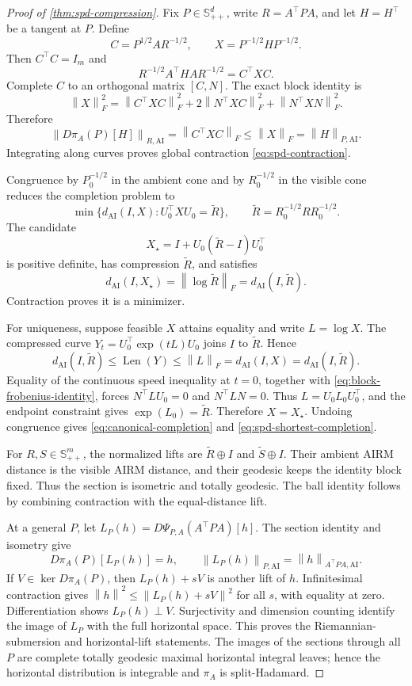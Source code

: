 \documentclass[10pt,a4paper]{amsart}
\newcommand{\AI}{\mathrm{AI}}
\newcommand{\SPD}{\mathbb S_{++}}
\newcommand{\dai}{d_{\AI}}
\newcommand{\fro}[1]{\left\lVert #1\right\rVert_F}
\newcommand{\norm}[1]{\left\lVert #1\right\rVert}
\begin{document}
\begin{proof}[Proof of \cref{thm:spd-compression}]
Fix \(P\in\SPD^d\), write \(R=A^\top PA\), and let \(H=H^\top\) be a
tangent at \(P\).  Define
\[
  C=P^{1/2}AR^{-1/2},
  \qquad
  X=P^{-1/2}HP^{-1/2}.
\]
Then \(C^\top C=I_m\) and
\[
  R^{-1/2}A^\top HA R^{-1/2}=C^\top XC.
\]
Complete \(C\) to an orthogonal matrix \([C,N]\).  The exact block identity
is
\begin{equation}
  \fro X^2
  =\fro{C^\top XC}^2
  +2\fro{N^\top XC}^2
  +\fro{N^\top XN}^2.
  \label{eq:block-frobenius-identity}
\end{equation}
Therefore
\[
  \norm{D\pi_A(P)[H]}_{R,\AI}
  =\fro{C^\top XC}
  \le\fro X
  =\norm H_{P,\AI}.
\]
Integrating along curves proves global contraction
\eqref{eq:spd-contraction}.

Congruence by \(P_0^{-1/2}\) in the ambient cone and by \(R_0^{-1/2}\) in
the visible cone reduces the completion problem to
\[
  \min\{\dai(I,X):U_0^\top XU_0=\widetilde R\},
  \qquad
  \widetilde R=R_0^{-1/2}RR_0^{-1/2}.
\]
The candidate
\[
  X_\star=I+U_0(\widetilde R-I)U_0^\top
\]
is positive definite, has compression \(\widetilde R\), and satisfies
\[
  \dai(I,X_\star)=\fro{\log\widetilde R}=\dai(I,\widetilde R).
\]
Contraction proves it is a minimizer.

For uniqueness, suppose feasible \(X\) attains equality and write
\(L=\log X\).  The compressed curve
\(Y_t=U_0^\top\exp(tL)U_0\) joins \(I\) to \(\widetilde R\).  Hence
\[
  \dai(I,\widetilde R)
  \le\operatorname{Len}(Y)
  \le\fro L
  =\dai(I,X)
  =\dai(I,\widetilde R).
\]
Equality of the continuous speed inequality at \(t=0\), together with
\eqref{eq:block-frobenius-identity}, forces
\(N^\top LU_0=0\) and \(N^\top LN=0\).  Thus
\(L=U_0L_0U_0^\top\), and the endpoint constraint gives
\(\exp(L_0)=\widetilde R\).  Therefore \(X=X_\star\).  Undoing congruence
gives \eqref{eq:canonical-completion} and
\eqref{eq:spd-shortest-completion}.

For \(R,S\in\SPD^m\), the normalized lifts are
\(\widetilde R\oplus I\) and \(\widetilde S\oplus I\).  Their ambient AIRM
distance is the visible AIRM distance, and their geodesic keeps the identity
block fixed.  Thus the section is isometric and totally geodesic.  The ball
identity follows by combining contraction with the equal-distance lift.

At a general \(P\), let
\(L_P(h)=D\Psi_{P,A}(A^\top PA)[h]\).  The section identity and isometry give
\[
  D\pi_A(P)[L_P(h)]=h,
  \qquad
  \norm{L_P(h)}_{P,\AI}=\norm h_{A^\top PA,\AI}.
\]
If \(V\in\ker D\pi_A(P)\), then \(L_P(h)+sV\) is another lift of \(h\).
Infinitesimal contraction gives
\(\norm h^2\le\norm{L_P(h)+sV}^2\) for all \(s\), with equality at zero.
Differentiation shows \(L_P(h)\perp V\).  Surjectivity and dimension counting
identify the image of \(L_P\) with the full horizontal space.  This proves
the Riemannian-submersion and horizontal-lift statements.  The images of the
sections through all \(P\) are complete totally geodesic maximal horizontal
integral leaves; hence the horizontal distribution is integrable and
\(\pi_A\) is split-Hadamard.


\end{proof}
\end{document}
